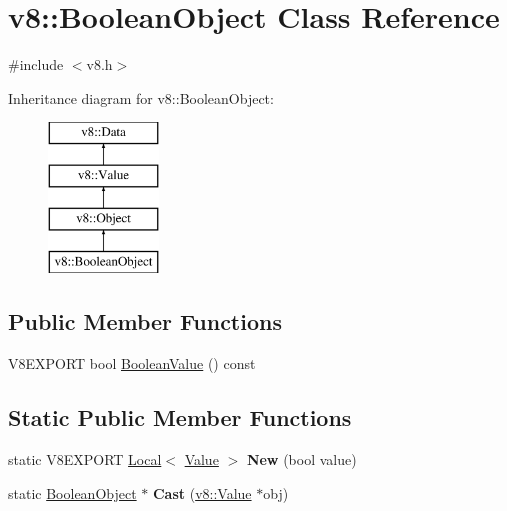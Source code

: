 \hypertarget{classv8_1_1_boolean_object}{}\section{v8\+:\+:Boolean\+Object Class Reference}
\label{classv8_1_1_boolean_object}


{\ttfamily \#include $<$v8.\+h$>$}

Inheritance diagram for v8\+:\+:Boolean\+Object\+:\begin{figure}[H]
\begin{center}
\leavevmode
\includegraphics[height=4.000000cm]{classv8_1_1_boolean_object}
\end{center}
\end{figure}
\subsection*{Public Member Functions}
\begin{DoxyCompactItemize}
\item 
V8\+E\+X\+P\+O\+R\+T bool \hyperlink{classv8_1_1_boolean_object_acd3e4192c2206d9f7f61975fc8f08728}{Boolean\+Value} () const 
\end{DoxyCompactItemize}
\subsection*{Static Public Member Functions}
\begin{DoxyCompactItemize}
\item 
\hypertarget{classv8_1_1_boolean_object_a93c15f320fa3922f05ffa16194e26d41}{}static V8\+E\+X\+P\+O\+R\+T \hyperlink{classv8_1_1_local}{Local}$<$ \hyperlink{classv8_1_1_value}{Value} $>$ {\bfseries New} (bool value)\label{classv8_1_1_boolean_object_a93c15f320fa3922f05ffa16194e26d41}

\item 
\hypertarget{classv8_1_1_boolean_object_ac701398c9b1c74fbce31d66106c9a87f}{}static \hyperlink{classv8_1_1_boolean_object}{Boolean\+Object} $\ast$ {\bfseries Cast} (\hyperlink{classv8_1_1_value}{v8\+::\+Value} $\ast$obj)\label{classv8_1_1_boolean_object_ac701398c9b1c74fbce31d66106c9a87f}

\end{DoxyCompactItemize}


